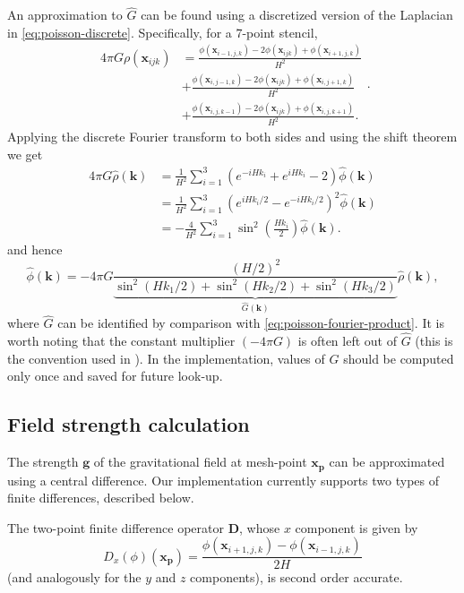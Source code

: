 An approximation to $\hat{G}$ can be found using a discretized version of the Laplacian in \autoref{eq:poisson-discrete}.
Specifically, for a 7-point stencil,
\begin{equation*}
    \begin{split}
        4\pi G\rho(\mathbf{x}_{ijk})
         & =\frac{\phi(\mathbf{x}_{i-1,j,k}) - 2\phi(\mathbf{x}_{ijk})+\phi(\mathbf{x}_{i+1,j,k})}{H^2}   \\
         & + \frac{\phi(\mathbf{x}_{i,j-1,k}) - 2\phi(\mathbf{x}_{ijk})+\phi(\mathbf{x}_{i,j+1,k})}{H^2}  \\
         & + \frac{\phi(\mathbf{x}_{i,j,k-1}) - 2\phi(\mathbf{x}_{ijk})+\phi(\mathbf{x}_{i,j,k+1})}{H^2}.
    \end{split}.
\end{equation*}
Applying the discrete Fourier transform to both sides and using the shift theorem we get
\begin{align*}
    4\pi G \hat{\rho}(\mathbf{k})
     & = \frac{1}{H^2}\sum_{i=1}^{3}\left( e^{-iHk_i} + e^{iHk_i}-2 \right)\hat{\phi}(\mathbf{k})       \\
     & = \frac{1}{H^2} \sum_{i=1}^{3}\left( e^{iHk_i/2} - e^{-iHk_i/2} \right)^2 \hat{\phi}(\mathbf{k}) \\
     & = -\frac{4}{H^2}\sum_{i=1}^{3}\sin^2\left(\frac{Hk_i}{2}\right)\hat{\phi}(\mathbf{k}).
\end{align*}
and hence
\begin{equation*}
    \hat{\phi}(\mathbf{k}) = -4\pi G\underbrace{\frac{(H/2)^2}{\sin^2(Hk_1/2) + \sin^2(Hk_2/2) + \sin^2 (Hk_3/2)}}_{\hat{G}(\mathbf{k})} \hat{\rho}(\mathbf{k}),
\end{equation*}
where $\hat{G}$ can be identified by comparison with \autoref{eq:poisson-fourier-product}.
It is worth noting that the constant multiplier $(-4\pi G)$ is often left out of $\hat{G}$ (this is the convention used in \cite{Hockney1988}).
In the implementation, values of $\hat{G}$ should be computed only once and saved for future look-up.

\subsection{Field strength calculation}
The strength $\mathbf{g}$ of the gravitational field at mesh-point $\mathbf{x}_\mathbf{p}$ can be approximated using a central difference.
Our implementation currently supports two types of finite differences, described below.

The two-point finite difference operator $\mathbf{D}$, whose $x$ component is given by
\begin{equation*}
    D_x(\phi)(\mathbf{x_\mathbf{p}}) = \frac{\phi(\mathbf{x}_{i+1,j,k}) - \phi(\mathbf{x}_{i-1,j,k})}{2H}
\end{equation*}
(and analogously for the $y$ and $z$ components), is second order accurate.

